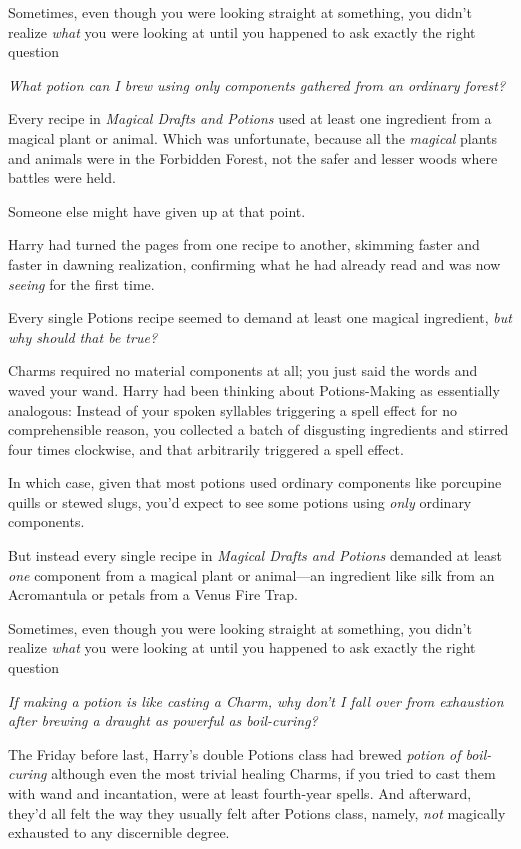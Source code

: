 Sometimes, even though you were looking straight at something, you didn't
realize \emph{what} you were looking at until you happened to ask exactly the
right question{\el}

\emph{What potion can I brew using only components gathered from an ordinary
forest?}

Every recipe in \emph{Magical Drafts and Potions} used at least one ingredient
from a magical plant or animal. Which was unfortunate, because all the
\emph{magical} plants and animals were in the Forbidden Forest, not the safer
and lesser woods where battles were held.

Someone else might have given up at that point.

Harry had turned the pages from one recipe to another, skimming faster and
faster in dawning realization, confirming what he had already read and was now
\emph{seeing} for the first time.

Every single Potions recipe seemed to demand at least one magical ingredient,
\emph{but why should that be true?}

Charms required no material components at all; you just said the words and
waved your wand. Harry had been thinking about Potions-Making as essentially
analogous: Instead of your spoken syllables triggering a spell effect for no
comprehensible reason, you collected a batch of disgusting ingredients and
stirred four times clockwise, and that arbitrarily triggered a spell effect.

In which case, given that most potions used ordinary components like porcupine
quills or stewed slugs, you'd expect to see some potions using \emph{only}
ordinary components.

But instead every single recipe in \emph{Magical Drafts and Potions} demanded
at least \emph{one} component from a magical plant or animal---an ingredient
like silk from an Acromantula or petals from a Venus Fire Trap.

Sometimes, even though you were looking straight at something, you didn't
realize \emph{what} you were looking at until you happened to ask exactly the
right question{\el}

\emph{If making a potion is like casting a Charm, why don't I fall over from
exhaustion after brewing a draught as powerful as boil-curing?}

The Friday before last, Harry's double Potions class had brewed \emph{potion of
boil-curing{\el}} although even the most trivial healing Charms, if you
tried to cast them with wand and incantation, were at least fourth-year spells.
And afterward, they'd all felt the way they usually felt after Potions class,
namely, \emph{not} magically exhausted to any discernible degree.

